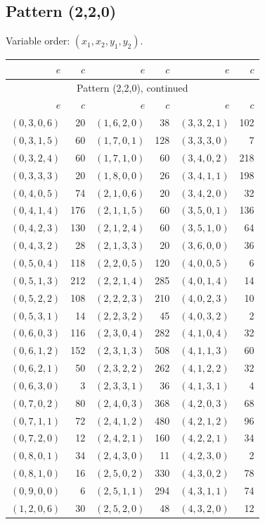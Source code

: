 \subsection{Pattern (2,2,0)}
Variable order: $(x_{1}, x_{2}, y_{1}, y_{2})$.
\begingroup\small
\setlength{\tabcolsep}{8pt}
\begin{longtable}{@{}rr@{\qquad}rr@{\qquad}rr@{}}
\toprule
$e$&$c$&$e$&$c$&$e$&$c$\\\midrule
\endfirsthead
\multicolumn{6}{c}{Pattern (2,2,0), continued}\\
\toprule
$e$&$c$&$e$&$c$&$e$&$c$\\\midrule
\endhead
$(0,3,0,6)$&20&$(1,6,2,0)$&38&$(3,3,2,1)$&102\\
$(0,3,1,5)$&60&$(1,7,0,1)$&128&$(3,3,3,0)$&7\\
$(0,3,2,4)$&60&$(1,7,1,0)$&60&$(3,4,0,2)$&218\\
$(0,3,3,3)$&20&$(1,8,0,0)$&26&$(3,4,1,1)$&198\\
$(0,4,0,5)$&74&$(2,1,0,6)$&20&$(3,4,2,0)$&32\\
$(0,4,1,4)$&176&$(2,1,1,5)$&60&$(3,5,0,1)$&136\\
$(0,4,2,3)$&130&$(2,1,2,4)$&60&$(3,5,1,0)$&64\\
$(0,4,3,2)$&28&$(2,1,3,3)$&20&$(3,6,0,0)$&36\\
$(0,5,0,4)$&118&$(2,2,0,5)$&120&$(4,0,0,5)$&6\\
$(0,5,1,3)$&212&$(2,2,1,4)$&285&$(4,0,1,4)$&14\\
$(0,5,2,2)$&108&$(2,2,2,3)$&210&$(4,0,2,3)$&10\\
$(0,5,3,1)$&14&$(2,2,3,2)$&45&$(4,0,3,2)$&2\\
$(0,6,0,3)$&116&$(2,3,0,4)$&282&$(4,1,0,4)$&32\\
$(0,6,1,2)$&152&$(2,3,1,3)$&508&$(4,1,1,3)$&60\\
$(0,6,2,1)$&50&$(2,3,2,2)$&262&$(4,1,2,2)$&32\\
$(0,6,3,0)$&3&$(2,3,3,1)$&36&$(4,1,3,1)$&4\\
$(0,7,0,2)$&80&$(2,4,0,3)$&368&$(4,2,0,3)$&68\\
$(0,7,1,1)$&72&$(2,4,1,2)$&480&$(4,2,1,2)$&96\\
$(0,7,2,0)$&12&$(2,4,2,1)$&160&$(4,2,2,1)$&34\\
$(0,8,0,1)$&34&$(2,4,3,0)$&11&$(4,2,3,0)$&2\\
$(0,8,1,0)$&16&$(2,5,0,2)$&330&$(4,3,0,2)$&78\\
$(0,9,0,0)$&6&$(2,5,1,1)$&294&$(4,3,1,1)$&74\\
$(1,2,0,6)$&30&$(2,5,2,0)$&48&$(4,3,2,0)$&12\\

\end{longtable}
